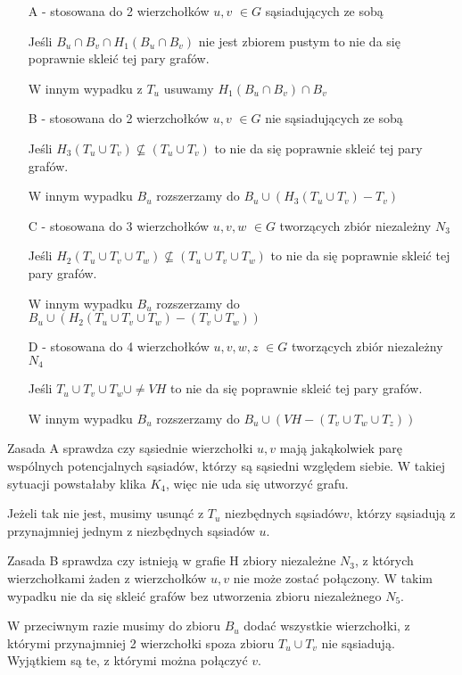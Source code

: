 \documentclass[11pt]{article}
\begin{document}
\begin{itemize}
  \item[A] - stosowana do 2 wierzchołków $u,v$ $\in G$ sąsiadujących ze sobą 
  
  Jeśli $B_u \cap B_v \cap H_1(B_u \cap B_v)$ nie jest zbiorem pustym to nie da się 
  poprawnie skleić tej pary grafów. 
  
  W innym wypadku z $T_u$ usuwamy $H_1(B_u \cap B_v) \cap B_v $  
  \item[B] - stosowana do 2 wierzchołków $u,v$ $\in G$ nie sąsiadujących ze sobą 
  
  Jeśli $H_3(T_u \cup T_v) \not\subseteq (T_u \cup T_v)$ to nie da się poprawnie skleić tej 
  pary grafów. 
  
  W innym wypadku $B_u$ rozszerzamy do $B_u \cup (H_3(T_u \cup T_v) - T_v)$
  \item[C] - stosowana do 3 wierzchołków $u,v,w$ $\in G$ tworzących zbiór niezależny $N_3$ 
  
  Jeśli $H_2(T_u \cup T_v \cup T_w) \not\subseteq (T_u \cup T_v \cup T_w)$ 
  to nie da się poprawnie skleić tej pary grafów. 
  
  W innym wypadku $B_u$ rozszerzamy do $B_u \cup (H_2(T_u \cup T_v \cup T_w) - (T_v \cup T_w))$
  \item[D] - stosowana do 4 wierzchołków $u,v,w,z$ $\in G$ tworzących zbiór niezależny $N_4$  
  
  Jeśli $T_u \cup T_v \cup T_w \cup \neq VH $ to nie da się poprawnie skleić tej pary grafów.
  
  W innym wypadku $B_u$ rozszerzamy do $B_u \cup (VH - (T_v \cup T_w \cup T_z))$
\end{itemize}

Zasada A sprawdza czy sąsiednie wierzchołki $u, v$ mają jakąkolwiek parę wspólnych potencjalnych sąsiadów, którzy są sąsiedni względem siebie.
W takiej sytuacji powstałaby klika $K_4$, więc nie uda się utworzyć grafu. \par

Jeżeli tak nie jest, musimy usunąć z $T_u$ niezbędnych sąsiadów$ v$, 
którzy sąsiadują z przynajmniej jednym z niezbędnych sąsiadów $u$. 

Zasada B sprawdza czy istnieją w grafie H zbiory niezależne $N_3$, z których wierzchołkami żaden z wierzchołków $u, v $ nie może zostać połączony. W takim wypadku nie da się skleić grafów bez utworzenia zbioru niezależnego $N_5$. 

W przeciwnym razie musimy do zbioru $B_u$ dodać wszystkie wierzchołki, 
z którymi przynajmniej 2 wierzchołki spoza zbioru $T_u \cup T_v$ nie sąsiadują. Wyjątkiem są te, z którymi można połączyć $v$. \par
\end{document}
